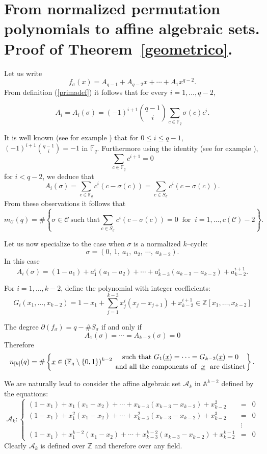 \documentclass[a4paper,twoside]{article}
\begin{document}
\section{From normalized permutation polynomials to affine algebraic sets. Proof of Theorem~\ref{geometrico}.}

Let us write
$$f_\sigma(x)=A_{q-1}+A_{q-2}x+\cdots+A_{1}x^{q-2}.$$
{From} definition (\ref{primadef}) it follows that for every $i=1,\ldots,q-2$,

$$A_i=A_i(\sigma)=(-1)^{i+1} \binom{q-1}{i}
\sum_{c\in\mathbb F_q}\sigma(c)c^i.$$

It is well known (see for example \cite[Exercise 7.1]{LN}) that
for $0\leq i\leq q-1$, $(-1)^{i+1} \binom{q-1}{i} =-1$ in $\mathbb
F_q$. Furthermore using the identity (see for example \cite[Lemma
6.3]{LN}),
$$\sum_{c\in\mathbb F_q}c^{i+1}=0$$
for $i<q-2$, we deduce that
$$A_i(\sigma)=\sum_{c\in\mathbb F_q}c^i(c-\sigma(c))=\sum_{c\in S_\sigma}c^i(c-\sigma(c)).$$
{From} these observations it follows that
$$m_{\mathcal C}(q)=\#\left\{\sigma\in\mathcal C\ \text{such that} \sum_{c\in S_\sigma}c^i(c-\sigma(c))=0\
\text{ for }\ i=1,\ldots,c(\mathcal C)-2\right\}.$$

Let us now specialize to the case when $\sigma$ is a normalized
$k$--cycle:
$$\sigma=(0,\ 1,\ a_{1},\ a_{2},\ \cdots,\ a_{k-2}).$$
In this case
$$A_i(\sigma)=(1-a_1)+a_1^i(a_1-a_2)+\cdots+a_{k-3}^i(a_{k-3}-a_{k-2})+a_{k-2}^{i+1}.$$

For $i=1,\ldots,k-2$, define the polynomial with integer coefficients:
\begin{equation}\label{prime}
G_{i}(x_1,\ldots,x_{k-2})=1-x_1+\sum_{j=1}^{k-3}x_{j}^i(x_{j}-x_{j+1})+x_{k-2}^{i+1}
\in\mathbb Z[x_1,\ldots,x_{k-2}]\end{equation}

The degree $\partial(f_\sigma)=q-\#S_\sigma$ if and only if
$$A_1(\sigma)=\cdots=A_{k-2}(\sigma)=0$$
Therefore
\begin{equation}\nonumber
n_{[k]}(q)=\#
\left\{\underline{x}\in(\mathbb F_q\setminus\{0,1\})^{k-2}\  \genfrac{}{}{0pt}{}{\text{such that } G_{1}(\underline{x})=\cdots=G_{k-2}(\underline{x})=0}
{\text{and all the components of }\ \underline{x}\ \text{ are distinct}}
\right\}.\end{equation}

We are naturally lead to consider the affine algebraic set $\mathcal A_k$ in
$\mathbb A^{k-2}$ defined by the equations:
\begin{equation}\mathcal A_k:\label{algsets}
\left\{\begin{array}{rcl}
(1-x_1)+x_1(x_1-x_2)+\cdots +x_{k-3}(x_{k-3}-x_{k-2})+x_{k-2}^{2}& = &0\\
(1-x_1)+x_1^2(x_1-x_2)+\cdots +x_{k-3}^2(x_{k-3}-x_{k-2})+x_{k-2}^{3}& = &0\\
& \vdots & \\
(1-x_1)+x_1^{k-2}(x_1-x_2)+\cdots+ x_{k-3}^{k-2}(x_{k-3}-x_{k-2})+x_{k-2}^{k-1}& = &0
\end{array}\right.\end{equation}
Clearly $\mathcal A_k$ is defined over $\mathbb Z$ and therefore over any
field.
\end{document}
